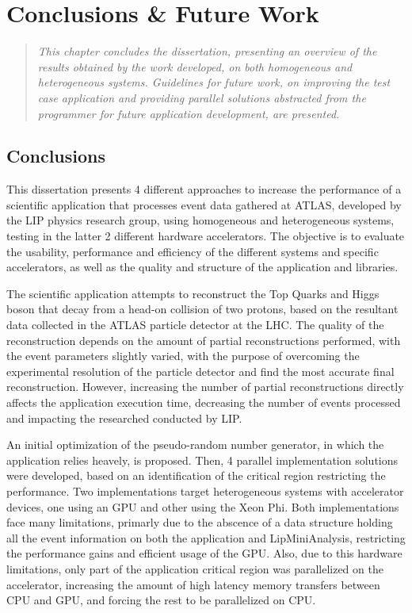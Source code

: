 \chapter{Conclusions \& Future Work}
\label{ConclusionFutureWork}

\begin{quote}
\textit{This chapter concludes the dissertation, presenting an overview of the results obtained by the work developed, on both homogeneous and heterogeneous systems. Guidelines for future work, on improving the test case application and providing parallel solutions abstracted from the programmer for future application development, are presented.}
\end{quote}

\section{Conclusions}
\label{Conclusion}

This dissertation presents 4 different approaches to increase the performance of a scientific application that processes event data gathered at ATLAS, developed by the LIP physics research group, using homogeneous and heterogeneous systems, testing in the latter 2 different hardware accelerators. The objective is to evaluate the usability, performance and efficiency of the different systems and specific accelerators, as well as the quality and structure of the application and libraries.

The scientific application attempts to reconstruct the Top Quarks and Higgs boson that decay from a head-on collision of two protons, based on the resultant data collected in the ATLAS particle detector at the LHC. The quality of the reconstruction depends on the amount of partial reconstructions performed, with the event parameters slightly varied, with the purpose of overcoming the experimental resolution of the particle detector and find the most accurate final reconstruction. However, increasing the number of partial reconstructions directly affects the application execution time, decreasing the number of events processed and impacting the researched conducted by LIP.

An initial optimization of the pseudo-random number generator, in which the application relies heavely, is proposed. Then, 4 parallel implementation solutions were developed, based on an identification of the critical region restricting the performance. Two implementations target heterogeneous systems with accelerator devices, one using an \nvidia GPU and other using the \intel Xeon Phi. Both implementations face many limitations, primarly due to the abscence of a data structure holding all the event information on both the application and LipMiniAnalysis, restricting the performance gains and efficient usage of the GPU. Also, due to this hardware limitations, only part of the application critical region was parallelized on the accelerator, increasing the amount of high latency memory transfers between CPU and GPU, and forcing the rest to be parallelized on CPU.

